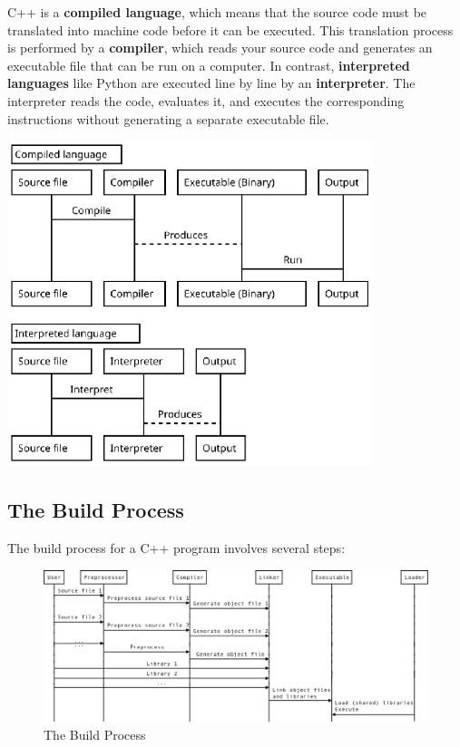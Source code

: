 \begin{minipage}[H]{0.43\textwidth}
    C++ is a \textbf{compiled language}, which means that the source code must be translated into machine code before it can be executed. This translation process is performed by a \textbf{compiler}, which reads your source code and generates an executable file that can be run on a computer. 
    \vspace{1em}
    \newline
    In contrast, \textbf{interpreted languages} like Python are executed line by line by an \textbf{interpreter}. The interpreter reads the code, evaluates it, and executes the corresponding instructions without generating a separate executable file.
\end{minipage}%
\hspace{0.02\textwidth}%
\begin{minipage}[H]{0.55\textwidth}
    \centering
    \includegraphics[width=0.8\textwidth]{assets/compiled_vs_interpreted.png}
    \label{fig:compiled_vs_interpreted}
\end{minipage}

\subsection{The Build Process}

The build process for a C++ program involves several steps:

\begin{figure}[H]
    \centering
    \includegraphics[width=\textwidth]{assets/build_process.png}
    \caption{The Build Process}
    \label{fig:build_process}
\end{figure}

